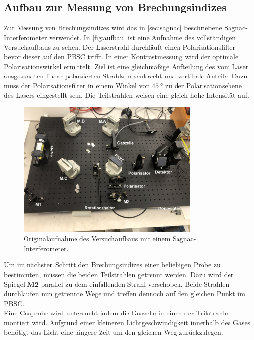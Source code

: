 \FloatBarrier

\subsection{Aufbau zur Messung von Brechungsindizes}
Zur Messung von Brechungsindizes wird das in \autoref{sec:sagnac} beschriebene Sagnac-Interferometer verwendet.
In \autoref{fig:aufbau} ist eine Aufnahme des vollständigen Versuchaufbaus zu sehen.
Der Laserstrahl durchläuft einen Polarisationsfilter bevor dieser auf den PBSC trifft.
In einer Kontrastmessung wird der optimale Polarisationswinkel ermittelt.
Ziel ist eine gleichmäßige Aufteilung des vom Laser ausgesandten linear polarsierten Strahls in senkrecht und vertikale Anteile.
Dazu muss der Polarisationsfilter in einem Winkel von $\qty{45}{\degree}$ zu der Polarisationsebene des Lasers eingestellt sein.
Die Teilstrahlen weisen eine gleich hohe Intensität auf.
\begin{figure}
    \centering
    \includegraphics[width=0.8\textwidth]{img/aufbau2.jpg}
    \caption{Originalaufnahme des Versuchaufbaus mit einem Sagnac-Interferometer.}
    \label{fig:aufbau_original}
\end{figure}
Um im nächsten Schritt den Brechungsindizes einer beliebigen Probe zu bestimmten, müssen die beiden Teilstrahlen getrennt werden.
Dazu wird der Spiegel $\textbf{M2}$ parallel zu dem einfallenden Strahl verschoben.
Beide Strahlen durchlaufen nun getrennte Wege und treffen dennoch auf den gleichen Punkt im PBSC.
\\
Eine Gasprobe wird untersucht indem die Gaszelle in einen der Teilstrahle montiert wird.
Aufgrund einer kleineren Lichtgeschwindigkeit innerhalb des Gases benötigt das Licht eine längere Zeit um den gleichen Weg zurückzulegen.
